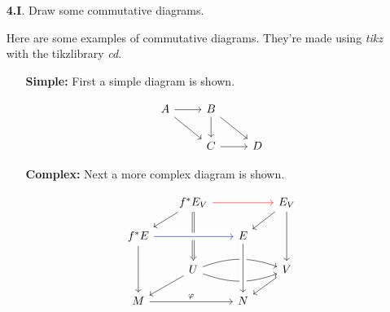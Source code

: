 \begin{enumerate}
      \qspace

      \item[\textbf{4.I}.]
        Draw some commutative diagrams.

        \aspace

        Here are some examples of commutative diagrams. They're made using \textit{tikz} with the tikzlibrary \textit{cd}.

        \begin{enumerate}
          \item[\textbf{Simple:}]
            First a simple diagram is shown.

            \begin{equation*}
              \begin{tikzcd}
                A \arrow[r] \arrow[rd] & B \arrow[d] \arrow[rd] \\
                            & C \arrow[r] & D
              \end{tikzcd}
            \end{equation*}

          \item[\textbf{Complex:}]
            Next a more complex diagram is shown.

            \begin{equation*}
              \begin{tikzcd}[row sep=scriptsize, column sep=scriptsize]
                & f^* E_V \arrow[dl] \arrow[rr, red] \arrow[dd, Rightarrow] & & E_V \arrow[dl] \arrow[dd] \\
                f^* E \arrow[rr, crossing over, blue] \arrow[dd] & & E \\
                & U \arrow[dl] \arrow[rr, bend left=20] \arrow[rr, bend right=20] & & V \arrow[dl] \\
                M \arrow[rr, "\varphi"] & & N \arrow[from=uu, crossing over]\\
              \end{tikzcd}
            \end{equation*}

        \end{enumerate}

    \end{enumerate}

  \listoftodos

